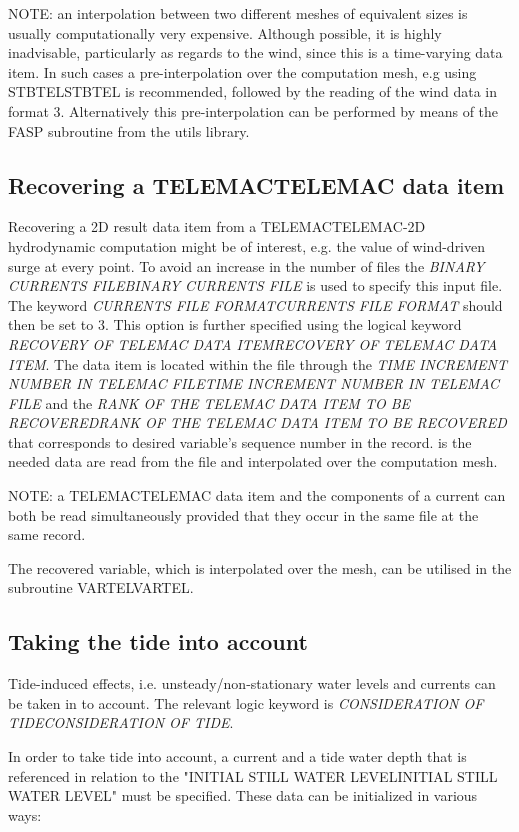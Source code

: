  NOTE: an interpolation between two different meshes of equivalent sizes is usually computationally very expensive. Although possible, it is highly inadvisable, particularly as regards to the wind, since this is a time-varying data item. In such cases a pre-interpolation over the computation mesh, e.g using STBTELSTBTEL is recommended, followed by the reading of the wind data in format 3. Alternatively this pre-interpolation can be performed by means of the FASP subroutine from the utils library.


\subsection{ Recovering a TELEMACTELEMAC data item}

 Recovering a 2D result data item from a TELEMACTELEMAC-2D hydrodynamic computation might be of interest, e.g. the value of wind-driven surge at every point. To avoid an increase in the number of files the \textit{BINARY CURRENTS FILEBINARY CURRENTS FILE} is used to specify this input file. The keyword \textit{CURRENTS FILE FORMATCURRENTS FILE FORMAT} should then be set to 3. This option is further specified using the logical keyword \textit{RECOVERY OF TELEMAC DATA ITEMRECOVERY OF TELEMAC DATA ITEM}. The data item is located within the file through the \textit{TIME INCREMENT NUMBER IN TELEMAC FILETIME INCREMENT NUMBER IN TELEMAC FILE} and the \textit{RANK OF THE TELEMAC DATA ITEM TO BE RECOVEREDRANK OF THE TELEMAC DATA ITEM TO BE RECOVERED }that corresponds to desired variable's sequence number in the record. is the needed data are read from the file and interpolated over the computation mesh.

 NOTE: a TELEMACTELEMAC data item and the components of a current can both be read simultaneously provided that they occur in the same file at the same record.

 The recovered variable, which is interpolated over the mesh, can be utilised in the subroutine VARTELVARTEL.


\subsection{ Taking the tide into account}

 Tide-induced effects, i.e. unsteady/non-stationary water levels and currents can be taken in to account. The relevant logic keyword is \textit{CONSIDERATION OF TIDECONSIDERATION OF TIDE}.

 In order to take tide into account, a current and a tide water depth that is referenced in relation to the "INITIAL STILL WATER LEVELINITIAL STILL WATER LEVEL" must be specified. These data can be initialized in various ways:

